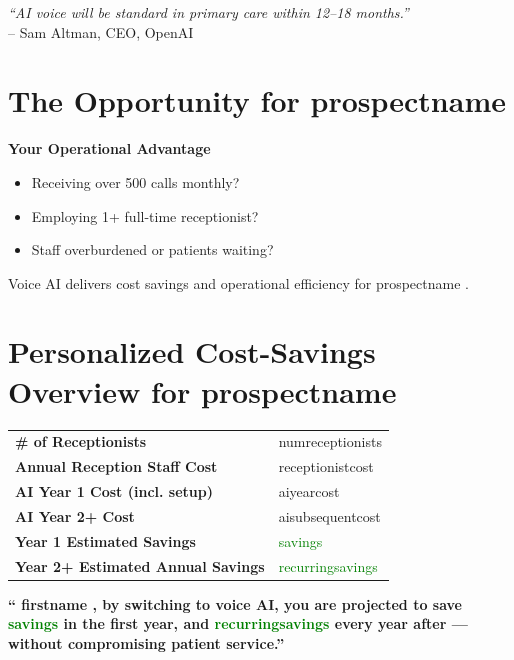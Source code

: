 \documentclass[10pt]{article}
\newcommand{\prospectname}{{ prospectname }}
\newcommand{\firstname}{{ firstname }}
\newcommand{\numreceptionists}{{ numreceptionists }}
\newcommand{\receptionistcost}{{ receptionistcost }}
\newcommand{\aiyearcost}{{ aiyearcost }}
\newcommand{\aisubsequentcost}{{ aisubsequentcost }}
\newcommand{\savings}{{ savings }}
\newcommand{\recurringsavings}{{ recurringsavings }}
\begin{document}
\vspace{1cm}
\begin{flushright}
    \textit{``AI voice will be standard in primary care within 12--18 months.''} \\
    -- Sam Altman, CEO, OpenAI
\end{flushright}

\vspace{1cm}

\section*{The Opportunity for \prospectname}
\textbf{Your Operational Advantage}
\begin{itemize}
    \item Receiving over 500 calls monthly?
    \item Employing 1+ full-time receptionist?
    \item Staff overburdened or patients waiting?
\end{itemize}

\newpage
Voice AI delivers cost savings and operational efficiency for \prospectname.

\vspace{0.5cm}

\section*{Personalized Cost-Savings Overview for \prospectname}
\begin{tabular}{ll}
    \toprule
    \textbf{\# of Receptionists} & \numreceptionists \\
    \textbf{Annual Reception Staff Cost} & \receptionistcost \\
    \textbf{AI Year 1 Cost (incl. setup)} & \aiyearcost \\
    \textbf{AI Year 2+ Cost} & \aisubsequentcost \\
    \textbf{Year 1 Estimated Savings} & \textcolor{green}{\savings} \\
    \textbf{Year 2+ Estimated Annual Savings} & \textcolor{green}{\recurringsavings} \\
    \bottomrule
\end{tabular}

\vspace{0.5cm}
\textbf{“\firstname, by switching to voice AI, you are projected to save \textcolor{green}{\savings} in the first year, and \textcolor{green}{\recurringsavings} every year after — without compromising patient service.”}
\end{document}
